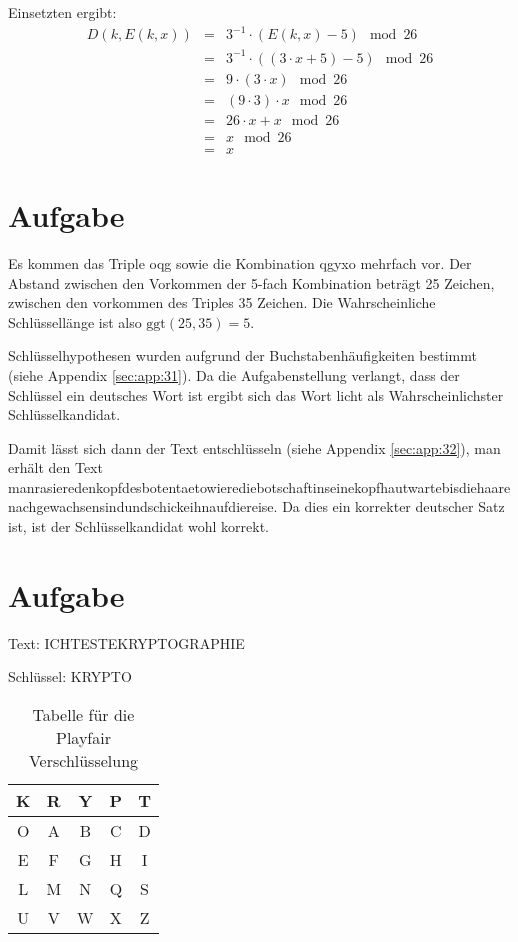 \documentclass[DIN, pagenumber=false, fontsize=11pt, parskip=half]{scrartcl}
\begin{document}
\begin{enumerate}[label=(\roman*)]
            Einsetzten ergibt:
            \begin{eqnarray*}
                D(k, E(k, x)) &=& 3^{-1} \cdot (E(k, x) - 5) \mod 26\\
                    &=& 3^{-1} \cdot \left((3 \cdot x + 5) - 5 \right) \mod 26 \\
                    &=& 9 \cdot (3 \cdot x) \mod 26 \\
                    &=& (9 \cdot 3) \cdot x \mod 26 \\
                    &=& 26 \cdot x + x \mod 26 \\
                    &=& x \mod 26 \\
                    &=& x
            \end{eqnarray*}
    \end{enumerate}

    \section{Aufgabe}
    Es kommen das Triple \glqq{}oqg\grqq{} sowie die Kombination \glqq{}qgyxo\grqq{} mehrfach vor.
    Der Abstand zwischen den Vorkommen der 5-fach Kombination beträgt 25 Zeichen, zwischen den vorkommen
    des Triples 35 Zeichen. Die Wahrscheinliche Schlüssellänge ist also $\text{ggt}(25, 35) = 5$.
    
    Schlüsselhypothesen wurden aufgrund der Buchstabenhäufigkeiten bestimmt (siehe Appendix \ref{sec:app:31}).
    Da die Aufgabenstellung verlangt, dass der Schlüssel ein deutsches Wort ist ergibt sich das Wort 
    \glqq{}licht\grqq{} als Wahrscheinlichster Schlüsselkandidat.

    Damit lässt sich dann der Text entschlüsseln (siehe Appendix \ref{sec:app:32}), man erhält den Text
    \glqq{}manrasieredenkopfdesbotentaetowierediebotschaftinseinekopfhautwartebisdiehaare nachgewachsensindundschickeihnaufdiereise\grqq{}.
    Da dies ein korrekter deutscher Satz ist, ist der Schlüsselkandidat wohl korrekt.

    \section{Aufgabe}
    Text: \glqq{}ICHTESTEKRYPTOGRAPHIE\grqq{}

    Schlüssel: \glqq{}KRYPTO\grqq{}

    \begin{table}[H]
        \centering
        \begin{tabular}{|c|c|c|c|c|}
            \toprule
            K & R & Y & P & T \\
            \midrule
            O & A & B & C & D \\
            \midrule
            E & F & G & H & I \\
            \midrule
            L & M & N & Q & S \\
            \midrule
            U & V & W & X & Z \\
            \bottomrule
        \end{tabular}
        \caption{Tabelle für die Playfair Verschlüsselung}
    \end{table}
    
\end{document}
